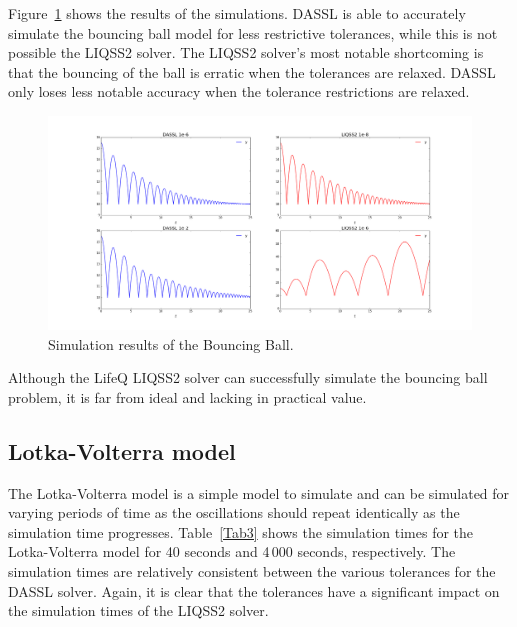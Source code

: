 \documentclass[10pt]{article}
\begin{document}
Figure~\ref{Fig2} shows the results of the simulations. DASSL is able to accurately simulate the bouncing ball model for less restrictive tolerances, while this is not possible the LIQSS2 solver. The LIQSS2 solver's most notable shortcoming is that the bouncing of the ball is erratic when the tolerances are relaxed. DASSL only loses less notable accuracy when the tolerance restrictions are relaxed.

    \begin{figure}[htbp]\centering
   \includegraphics[scale=0.32, clip,trim={50mm 1mm 45mm 10mm}]{./Fig/BBall.png}
\vspace{-0.8cm}
\caption{Simulation results of the Bouncing Ball.}\label{Fig2}
\end{figure}

Although the LifeQ LIQSS2 solver can successfully simulate the bouncing ball problem, it is far from ideal and lacking in practical value.

\newpage
\subsection{Lotka-Volterra model}

The Lotka-Volterra model is a simple model to simulate and can be simulated for varying periods of time as the oscillations should repeat identically as the simulation time progresses. Table~\ref{Tab3} shows the simulation times for the Lotka-Volterra model for 40 seconds and 4\,000 seconds, respectively. The simulation times are relatively consistent between the various tolerances for the DASSL solver. Again, it is clear that the tolerances have a significant impact on the simulation times of the LIQSS2 solver.
\end{document}
